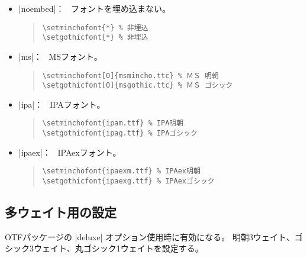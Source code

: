 \documentclass[a4paper,uplatex]{jsarticle}
\newcommand{\Pkg}[1]{\textsf{#1}}
\newcommand{\Means}{：\ }
\begin{document}
\begin{itemize}
\item |noembed|\Means
  フォントを埋め込まない。
\begin{quote}\small\begin{verbatim}
\setminchofont{*} % 非埋込
\setgothicfont{*} % 非埋込
\end{verbatim}\end{quote}

\item |ms|\Means
  MSフォント。
\begin{quote}\small\begin{verbatim}
\setminchofont[0]{msmincho.ttc} % ＭＳ 明朝
\setgothicfont[0]{msgothic.ttc} % ＭＳ ゴシック
\end{verbatim}\end{quote}

\item |ipa|\Means
  IPAフォント。
\begin{quote}\small\begin{verbatim}
\setminchofont{ipam.ttf} % IPA明朝
\setgothicfont{ipag.ttf} % IPAゴシック
\end{verbatim}\end{quote}

\item |ipaex|\Means
  IPAexフォント。
\begin{quote}\small\begin{verbatim}
\setminchofont{ipaexm.ttf} % IPAex明朝
\setgothicfont{ipaexg.ttf} % IPAexゴシック
\end{verbatim}\end{quote}
\end{itemize}

\subsection{多ウェイト用の設定}

\Pkg{OTF}パッケージの |deluxe| オプション使用時に有効になる。
明朝3ウェイト、ゴシック3ウェイト、丸ゴシック1ウェイトを設定する。
\end{document}
